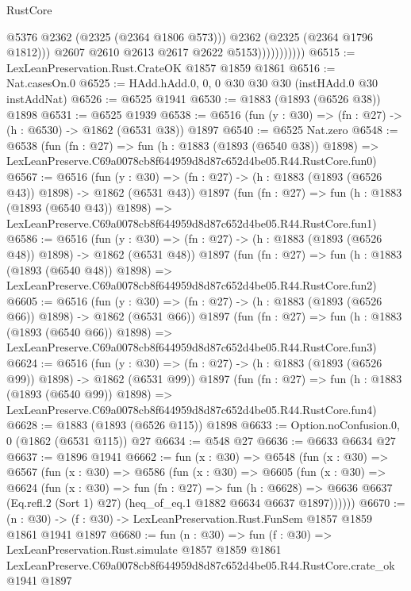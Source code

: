 \begin{lexlean}{RustCore}
\begin{coremodule}
                              @5376
                              @2362
                              (@2325 (@2364 @1806 @573)))
                            @2362
                            (@2325 (@2364 @1796 @1812)))
                          @2607
                          @2610
                          @2613
                          @2617
                          @2622
                          @5153)))))))))))
@6515 := LexLeanPreservation.Rust.CrateOK @1857 @1859 @1861
@6516 := Nat.casesOn.{0}
@6525 := HAdd.hAdd.{0, 0, 0} @30 @30 @30 (instHAdd.{0} @30 instAddNat)
@6526 := @6525 @1941
@6530 := @1883 (@1893 (@6526 @38)) @1898
@6531 := @6525 @1939
@6538 := @6516 (fun (y : @30) => (fn : @27) -> (h : @6530) -> @1862 (@6531 @38)) @1897
@6540 := @6525 Nat.zero
@6548 := @6538
    (fun (fn : @27) =>
    fun (h : @1883 (@1893 (@6540 @38)) @1898) =>
    LexLeanPreserve.C69a0078cb8f644959d8d87c652d4be05.R44.RustCore.fun0)
@6567 := @6516
    (fun (y : @30) => (fn : @27) -> (h : @1883 (@1893 (@6526 @43)) @1898) -> @1862 (@6531 @43))
    @1897
    (fun (fn : @27) =>
    fun (h : @1883 (@1893 (@6540 @43)) @1898) =>
    LexLeanPreserve.C69a0078cb8f644959d8d87c652d4be05.R44.RustCore.fun1)
@6586 := @6516
    (fun (y : @30) => (fn : @27) -> (h : @1883 (@1893 (@6526 @48)) @1898) -> @1862 (@6531 @48))
    @1897
    (fun (fn : @27) =>
    fun (h : @1883 (@1893 (@6540 @48)) @1898) =>
    LexLeanPreserve.C69a0078cb8f644959d8d87c652d4be05.R44.RustCore.fun2)
@6605 := @6516
    (fun (y : @30) => (fn : @27) -> (h : @1883 (@1893 (@6526 @66)) @1898) -> @1862 (@6531 @66))
    @1897
    (fun (fn : @27) =>
    fun (h : @1883 (@1893 (@6540 @66)) @1898) =>
    LexLeanPreserve.C69a0078cb8f644959d8d87c652d4be05.R44.RustCore.fun3)
@6624 := @6516
    (fun (y : @30) => (fn : @27) -> (h : @1883 (@1893 (@6526 @99)) @1898) -> @1862 (@6531 @99))
    @1897
    (fun (fn : @27) =>
    fun (h : @1883 (@1893 (@6540 @99)) @1898) =>
    LexLeanPreserve.C69a0078cb8f644959d8d87c652d4be05.R44.RustCore.fun4)
@6628 := @1883 (@1893 (@6526 @115)) @1898
@6633 := Option.noConfusion.{0, 0} (@1862 (@6531 @115)) @27
@6634 := @548 @27
@6636 := @6633 @6634 @27
@6637 := @1896 @1941
@6662 := fun (x : @30) =>
  @6548
    (fun (x : @30) =>
    @6567
      (fun (x : @30) =>
      @6586
        (fun (x : @30) =>
        @6605
          (fun (x : @30) =>
          @6624
            (fun (x : @30) =>
            fun (fn : @27) =>
            fun (h : @6628) =>
            @6636 @6637 (Eq.refl.{2} (Sort 1) @27) (heq_of_eq.{1} @1882 @6634 @6637 @1897))))))
@6670 := (n : @30) -> (f : @30) -> LexLeanPreservation.Rust.FunSem @1857 @1859 @1861 @1941 @1897
@6680 := fun (n : @30) =>
  fun (f : @30) =>
  LexLeanPreservation.Rust.simulate
    @1857
    @1859
    @1861
    LexLeanPreserve.C69a0078cb8f644959d8d87c652d4be05.R44.RustCore.crate_ok
    @1941
    @1897
\end{coremodule}
\end{lexlean}
